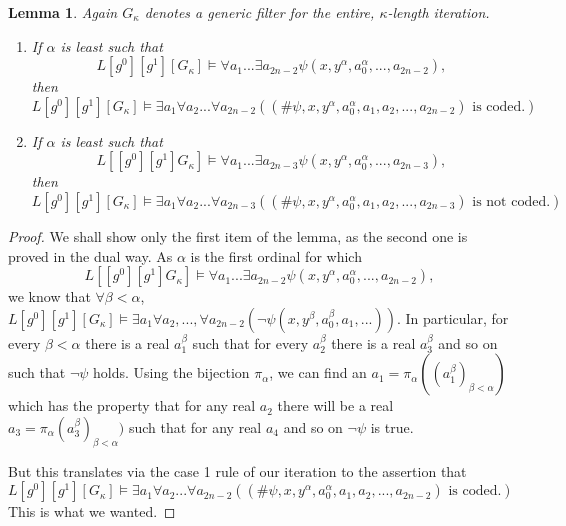 \documentclass[a4paper,11pt]{article}
\newtheorem{lemma}[theorem]{Lemma}
\begin{document}
\begin{lemma}
Again $G_{\kappa}$ denotes a generic filter for the entire, $\kappa$-length iteration.
\begin{enumerate}
\item If $\alpha$ is least such that
\[L[g^0][g^1][G_{\kappa}] \models \forall a_1...\exists a_{2n-2} \psi(x,y^{\alpha},a^{\alpha}_0,...,a_{2n-2}),\]
then 
\[ L[g^0][g^1][G_{\kappa}] \models \exists a_1 \forall a_2 ...\forall a_{2n-2} ( (\# \psi, x,y^{\alpha},a_0^{\alpha},a_1,a_2,...,a_{2n-2} ) \text{ is coded}.) \]
\item If $\alpha$ is least such that
\[L[[g^0][g^1]G_{\kappa}] \models \forall a_1...\exists a_{2n-3} \psi(x,y^{\alpha},a^{\alpha}_0,...,a_{2n-3}),\]
then 
\[ L[g^0][g^1][G_{\kappa}] \models \exists a_1 \forall a_2 ...\forall a_{2n-3} ( (\# \psi, x,y^{\alpha},a_0^{\alpha},a_1,a_2,...,a_{2n-3} ) \text{ is not coded}.) \]
\end{enumerate}
\end{lemma}
\begin{proof}
We shall show only the first item of the lemma, as the second one is proved in the dual way.
As $\alpha$ is the first ordinal for which \[L[[g^0][g^1]G_{\kappa}] \models \forall a_1...\exists a_{2n-2} \psi(x,y^{\alpha},a^{\alpha}_0,...,a_{2n-2}),\] we know that
$\forall \beta < \alpha$, $L[g^0][g^1][G_{\kappa}] \models \exists a_1 \forall a_2,...,\forall a_{2n-2} (\lnot \psi (x,y^{\beta},a_0^{\beta}, a_1,...))$.
In particular, for every $\beta < \alpha$ there is a real $a_1^{\beta}$ such that for every $a_2^{\beta}$ there is a real $a_3^{\beta}$ and so on such that $\lnot \psi$ holds. Using the bijection $\pi_{\alpha}$, we can find an $a_1= \pi_{\alpha} ( (a_1^{\beta})_{\beta < \alpha} )$ which has the property that for any real $a_2$ there will be a real $a_3 = \pi_{\alpha} (a_3^{\beta})_{\beta <\alpha} )$ such that for any real $a_4$ and so on $\lnot \psi$ is true. 

But this translates via the case 1 rule of our iteration to the assertion that
\[ L[g^0][g^1][G_{\kappa}] \models \exists a_1 \forall a_2 ...\forall a_{2n-2} ( (\# \psi, x,y^{\alpha},a_0^{\alpha},a_1,a_2,...,a_{2n-2} ) \text{ is coded}.)\]
This is what we wanted.
\end{proof}
\end{document}
